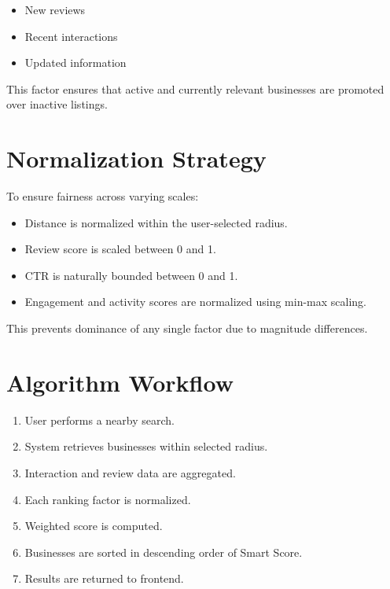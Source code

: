 \documentclass[12pt,a4paper]{report}
\begin{document}
\begin{itemize}

\item New reviews

\item Recent interactions

\item Updated information

\end{itemize}

This factor ensures that active and currently relevant businesses are promoted over inactive listings.

\section{Normalization Strategy}

To ensure fairness across varying scales:

\begin{itemize}

\item Distance is normalized within the user-selected radius.

\item Review score is scaled between 0 and 1.

\item CTR is naturally bounded between 0 and 1.

\item Engagement and activity scores are normalized using min-max scaling.

\end{itemize}

This prevents dominance of any single factor due to magnitude differences.

\section{Algorithm Workflow}

\begin{enumerate}

\item User performs a nearby search.

\item System retrieves businesses within selected radius.

\item Interaction and review data are aggregated.

\item Each ranking factor is normalized.

\item Weighted score is computed.

\item Businesses are sorted in descending order of Smart Score.

\item Results are returned to frontend.

\end{enumerate}
\end{document}
